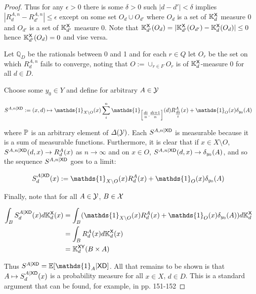 \begin{proof}
Thus for any $\epsilon>0$ there is some $\delta>0$ such $|d-d'|<\delta$ implies $|R^{A,n}_d-R^{A,n}_{d'}|\leq \epsilon$ except on some set $O_d\cup O_{d'}$ where $O_d$ is a set of $\mathbb{K}_d^{\mathsf{X}}$ measure 0 and $O_{d'}$ is a set of $\mathbb{K}_{d'}^{\mathsf{X}}$ measure 0. Note that $\mathbb{K}_{d'}^{\mathsf{X}}(O_d) = |\mathbb{K}_{d'}^{\mathsf{X}}(O_{d'})-\mathbb{K}_{d}^{\mathsf{X}}(O_d)|\leq 0$ hence $\mathbb{K}_{d'}^{\mathsf{X}}(O_d) = 0$ and vise versa.

Let $\mathbb{Q}_D$ be the rationals between 0 and 1 and for each $r\in Q$ let $O_r$ be the set on which $R^{A,n}_d$ fails to converge, noting that $O:=\cup_{r\in F} O_r$ is of $\mathbb{K}_{d}^{\mathsf{X}}$-measure 0 for all $d\in D$. 

Choose some $y_0\in Y$ and define for arbitrary $A\in \mathcal{Y}$

\begin{align}
	S^{A,n|\RV{X}\RV{D}}:= (x,d)\mapsto \mathds{1}_{X\setminus O}(x) \sum_{i}^n\mathds{1}_{\left[\tfrac{di}{n},\tfrac{di+1}{n}\right]}(d) R^A_{\tfrac{di }{i}}(x) + \mathds{1}_{O}(x) \delta_{y_0}(A)
\end{align}

where $\mathbb{P}$ is an arbitrary element of $\Delta(\mathcal{Y})$. Each $S^{A,n|\mathsf{XD}}$ is measurable because it is a sum of measurable functions. Furthermore, it is clear that if $x\in X\setminus O$, $S^{A,n|\mathsf{X}\mathsf{D}}(d,x)\to R^A_d(x)$ as $n\to \infty$ and on $x\in O$, $S^{A,n|\mathsf{XD}}(d,x)\to \delta_{y_0}(A)$, and so the sequence $S^{A,n|\mathsf{XD}}$ goes to a limit:

\begin{align}
	S^{A|\RV{XD}}_d(x):= \mathds{1}_{X\setminus O}(x) R^A_d(x) + \mathds{1}_O(x) \delta_{y_0}(A)
\end{align}

Finally, note that for all $A\in\mathcal{Y}$, $B\in \mathcal{X}$

\begin{align}
	\int_B S^{A|\RV{X}\RV{D}}_d(x) d\kernel{K}^{\RV{X}}_d(x) &= \int_B (\mathds{1}_{X\setminus O}(x) R^A_d(x) + \mathds{1}_O(x) \delta_{y_0}(A)) d\kernel{K}_d^{\RV{X}}\\
															   &= \int_B R^A_d(x) d\kernel{K}^{\RV{X}}_d(x)\\
															   &= \kernel{K}_{d}^{\RV{XY}}(B\times A)
\end{align}

Thus $S^{A|\RV{XD}}=\mathbb{E}[\mathds{1}_A|\RV{XD}]$. All that remains to be shown is that $A\mapsto S^{A|\mathsf{XD}}_d(x)$ is a probability measure for all $x\in X$, $d\in D$. This is a standard argument that can be found, for example, in \citet{cinlar_probability_2011} pp. 151-152

\end{proof}

